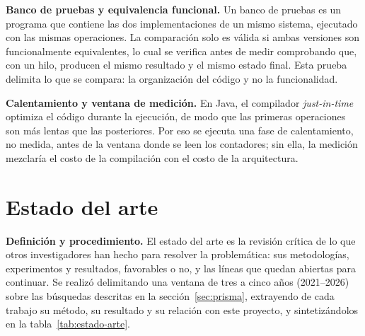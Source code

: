 \textbf{Banco de pruebas y equivalencia funcional.} Un banco de pruebas es un programa que contiene las dos implementaciones de un mismo sistema, ejecutado con las mismas operaciones. La comparación solo es válida si ambas versiones son funcionalmente equivalentes, lo cual se verifica antes de medir comprobando que, con un hilo, producen el mismo resultado y el mismo estado final. Esta prueba delimita lo que se compara: la organización del código y no la funcionalidad.

\textbf{Calentamiento y ventana de medición.} En Java, el compilador \textit{just-in-time} optimiza el código durante la ejecución, de modo que las primeras operaciones son más lentas que las posteriores. Por eso se ejecuta una fase de calentamiento, no medida, antes de la ventana donde se leen los contadores; sin ella, la medición mezclaría el costo de la compilación con el costo de la arquitectura.

\section{Estado del arte}
\label{sec:estado-arte}

\textbf{Definición y procedimiento.} El estado del arte es la revisión crítica de lo que otros investigadores han hecho para resolver la problemática: sus metodologías, experimentos y resultados, favorables o no, y las líneas que quedan abiertas para continuar. Se realizó delimitando una ventana de tres a cinco años (2021--2026) sobre las búsquedas descritas en la sección~\ref{sec:prisma}, extrayendo de cada trabajo su método, su resultado y su relación con este proyecto, y sintetizándolos en la tabla~\ref{tab:estado-arte}.

